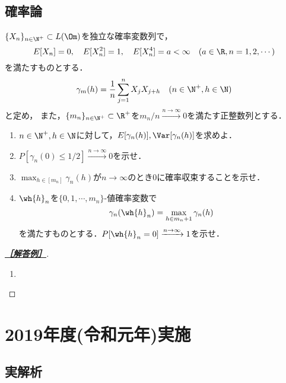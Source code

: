 \documentclass[uplatex,dvipdfmx]{jsarticle}
\begin{document}
\subsection{確率論}

\begin{tcolorbox}[colframe=ForestGreen, colback=ForestGreen!10!white,breakable,colbacktitle=ForestGreen!40!white,coltitle=black,fonttitle=\bfseries\sffamily,
    title=B 第18問（確率論）]
    $\{X_n\}_{n\in\N^+}\subset L(\Om)$を独立な確率変数列で，
    \[E[X_n]=0,\quad E[X_n^2]=1,\quad E[X_n^4]=a<\infty\quad(a\in\R,n=1,2,\cdots)\]
    を満たすものとする．
    \[\gamma_m(h)=\frac{1}{n}\sum_{j=1}^nX_jX_{j+h}\quad(n\in\N^+,h\in\N)\]
    と定め，
    また，$\{m_n\}_{n\in\N^+}\subset\R^+$を$m_n/n\xrightarrow{n\to\infty}0$を満たす正整数列とする．
    \begin{enumerate}
        \item $n\in\N^+,h\in\N$に対して，$E[\gamma_n(h)],\Var[\gamma_n(h)]$を求めよ．
        \item $P[\gamma_n(0)\le 1/2]\xrightarrow{n\to\infty}0$を示せ．
        \item $\max_{h\in[m_n]}\gamma_n(h)$が$n\to\infty$のとき$0$に確率収束することを示せ．
        \item $\wh{h}_n$を$\{0,1,\cdots,m_n\}$-値確率変数で
        \[\gamma_n(\wh{h}_n)=\max_{h\in m_n+1}\gamma_n(h)\]
        を満たすものとする．$P[\wh{h}_n=0]\xrightarrow{n\to\infty}1$を示せ．
    \end{enumerate}
\end{tcolorbox}
\begin{proof}[\textbf{\underline{［解答例］}}]\mbox{}
    \begin{enumerate}
        \item 
    \end{enumerate}
\end{proof}


\section{2019年度(令和元年)実施}

\subsection{実解析}
\end{document}
